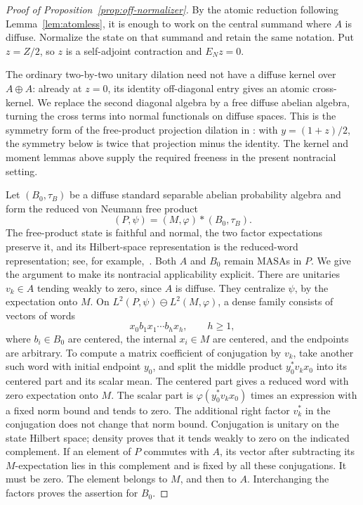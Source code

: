 \begin{proof}[Proof of Proposition~\ref{prop:off-normalizer}]
By the atomic reduction following Lemma~\ref{lem:atomless}, it is
enough to work on the central summand where $A$ is diffuse. Normalize
the state on that summand and retain the same notation. Put $z=Z/2$,
so $z$ is a self-adjoint contraction and $E_Nz=0$.

The ordinary two-by-two unitary dilation need not have a diffuse
kernel over $A\oplus A$: already at $z=0$, its identity off-diagonal
entry gives an atomic cross-kernel. We replace the second diagonal
algebra by a free diffuse abelian algebra, turning the cross terms
into normal functionals on diffuse spaces. This is the symmetry form
of the free-product projection dilation in
\cite[proof of Theorem~5.1]{PV15}: with $y=(1+z)/2$, the symmetry
below is twice that projection minus the identity. The kernel and
moment lemmas above supply the required freeness in the present
nontracial setting.

Let $(B_0,\tau_B)$ be a diffuse standard separable abelian probability
algebra and form the reduced von Neumann free product
\[
 (P,\psi)=(M,\varphi)*(B_0,\tau_B).
\]
The free-product state is faithful and normal, the two factor
expectations preserve it, and its Hilbert-space representation is
the reduced-word representation; see, for example,~\cite{HU}.
Both $A$ and $B_0$ remain MASAs in $P$. We give the argument to
make its nontracial applicability explicit. There are unitaries
$v_k\in A$ tending weakly to zero, since $A$ is diffuse. They
centralize $\psi$, by the expectation onto $M$. On
$L^2(P,\psi)\ominus L^2(M,\varphi)$, a dense family consists of
vectors of words
\[
 x_0 b_1 x_1\cdots b_hx_h,\qquad h\geq1,
\]
where $b_i\in B_0$ are centered, the internal $x_i\in M$ are
centered, and the endpoints are arbitrary. To compute a matrix
coefficient of conjugation by $v_k$, take another such word with
initial endpoint $y_0$, and split the middle product
$y_0^*v_kx_0$ into its centered part and its scalar mean. The
centered part gives a reduced word with zero expectation onto $M$.
The scalar part is $\varphi(y_0^*v_kx_0)$ times an expression with
a fixed norm bound and tends to zero. The additional right factor
$v_k^*$ in the conjugation does not change that norm bound.
Conjugation is unitary on the state Hilbert space; density proves
that it tends weakly to zero on the indicated complement. If an
element of $P$ commutes with $A$, its vector after subtracting its
$M$-expectation lies in this complement and is fixed by all these
conjugations. It must be zero. The element belongs to $M$, and
then to $A$. Interchanging the factors proves the assertion for
$B_0$.


\end{proof}
